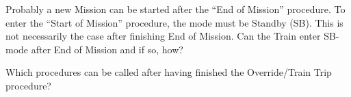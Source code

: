 \documentclass{template/openetcs_article}
\begin{document}
Probably a new Mission can be started after the ``End of Mission'' procedure.
To enter the ``Start of Mission'' procedure, the mode must be Standby (SB).
This is not necessarily the case after finishing End of Mission. 
Can the Train enter SB-mode after End of Mission and if so, how?

Which procedures can be called after having finished the Override/Train Trip procedure?









\end{document}
